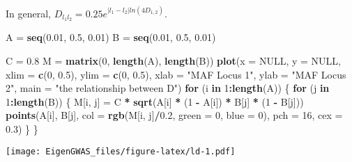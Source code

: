 \documentclass[]{book}
\newenvironment{Shaded}{\begin{snugshade}}{\end{snugshade}}
\newcommand{\ControlFlowTok}[1]{\textcolor[rgb]{0.13,0.29,0.53}{\textbf{#1}}}
\newcommand{\DataTypeTok}[1]{\textcolor[rgb]{0.13,0.29,0.53}{#1}}
\newcommand{\DecValTok}[1]{\textcolor[rgb]{0.00,0.00,0.81}{#1}}
\newcommand{\FloatTok}[1]{\textcolor[rgb]{0.00,0.00,0.81}{#1}}
\newcommand{\KeywordTok}[1]{\textcolor[rgb]{0.13,0.29,0.53}{\textbf{#1}}}
\newcommand{\NormalTok}[1]{#1}
\newcommand{\OperatorTok}[1]{\textcolor[rgb]{0.81,0.36,0.00}{\textbf{#1}}}
\newcommand{\OtherTok}[1]{\textcolor[rgb]{0.56,0.35,0.01}{#1}}
\newcommand{\StringTok}[1]{\textcolor[rgb]{0.31,0.60,0.02}{#1}}
\begin{document}
In general, \(D_{l_1l_2}=0.25e^{|l_1-l_2|ln(4D_{1,2})}\).

\begin{Shaded}
\begin{Highlighting}[]
\NormalTok{A =}\StringTok{ }\KeywordTok{seq}\NormalTok{(}\FloatTok{0.01}\NormalTok{, }\FloatTok{0.5}\NormalTok{, }\FloatTok{0.01}\NormalTok{)}
\NormalTok{B =}\StringTok{ }\KeywordTok{seq}\NormalTok{(}\FloatTok{0.01}\NormalTok{, }\FloatTok{0.5}\NormalTok{, }\FloatTok{0.01}\NormalTok{)}

\NormalTok{C =}\StringTok{ }\FloatTok{0.8}
\NormalTok{M =}\StringTok{ }\KeywordTok{matrix}\NormalTok{(}\DecValTok{0}\NormalTok{, }\KeywordTok{length}\NormalTok{(A), }\KeywordTok{length}\NormalTok{(B))}
\KeywordTok{plot}\NormalTok{(}\DataTypeTok{x =} \OtherTok{NULL}\NormalTok{, }\DataTypeTok{y =} \OtherTok{NULL}\NormalTok{, }\DataTypeTok{xlim =} \KeywordTok{c}\NormalTok{(}\DecValTok{0}\NormalTok{, }\FloatTok{0.5}\NormalTok{), }\DataTypeTok{ylim =} \KeywordTok{c}\NormalTok{(}\DecValTok{0}\NormalTok{, }\FloatTok{0.5}\NormalTok{), }\DataTypeTok{xlab =} \StringTok{"MAF Locus 1"}\NormalTok{, }
    \DataTypeTok{ylab =} \StringTok{"MAF Locus 2"}\NormalTok{, }\DataTypeTok{main =} \StringTok{"the relationship between D"}\NormalTok{)}
\ControlFlowTok{for}\NormalTok{ (i }\ControlFlowTok{in} \DecValTok{1}\OperatorTok{:}\KeywordTok{length}\NormalTok{(A)) \{}
    \ControlFlowTok{for}\NormalTok{ (j }\ControlFlowTok{in} \DecValTok{1}\OperatorTok{:}\KeywordTok{length}\NormalTok{(B)) \{}
\NormalTok{        M[i, j] =}\StringTok{ }\NormalTok{C }\OperatorTok{*}\StringTok{ }\KeywordTok{sqrt}\NormalTok{(A[i] }\OperatorTok{*}\StringTok{ }\NormalTok{(}\DecValTok{1} \OperatorTok{-}\StringTok{ }\NormalTok{A[i]) }\OperatorTok{*}\StringTok{ }\NormalTok{B[j] }\OperatorTok{*}\StringTok{ }\NormalTok{(}\DecValTok{1} \OperatorTok{-}\StringTok{ }\NormalTok{B[j]))}
        \KeywordTok{points}\NormalTok{(A[i], B[j], }\DataTypeTok{col =} \KeywordTok{rgb}\NormalTok{(M[i, j]}\OperatorTok{/}\FloatTok{0.2}\NormalTok{, }\DataTypeTok{green =} \DecValTok{0}\NormalTok{, }\DataTypeTok{blue =} \DecValTok{0}\NormalTok{), }\DataTypeTok{pch =} \DecValTok{16}\NormalTok{, }
            \DataTypeTok{cex =} \FloatTok{0.3}\NormalTok{)}
\NormalTok{    \}}
\NormalTok{\}}
\end{Highlighting}
\end{Shaded}

\texttt{[image: EigenGWAS\_files/figure-latex/ld-1.pdf]}


\end{document}
